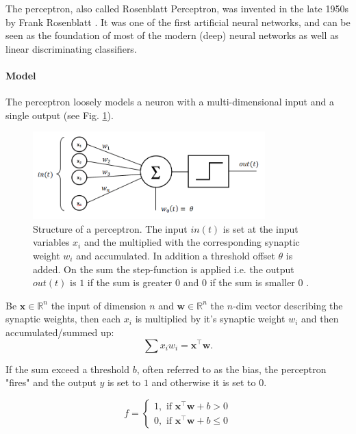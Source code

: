 The perceptron, also called Rosenblatt Perceptron, was invented in the late 1950s by Frank Rosenblatt \cite{rosenblatt1958perceptron}. 
It was one of the first artificial neural networks, and can be seen as the foundation of most of the modern (deep) neural networks as well as linear discriminating classifiers. 

\paragraph{Model}

The perceptron loosely models a neuron with a multi-dimensional input and a single output (see Fig. \ref{fig:perceptron}). 

\begin{figure}
	\centering
    	\includegraphics[width=0.8\textwidth]{imgs/percept.png} 
    \caption{Structure of a perceptron. The input $in(t)$ is set at the input variables $x_i$ and the multiplied with the corresponding synaptic weight $w_i$ and accumulated. In addition a threshold offset $\theta$ is added. On the sum the step-function is applied i.e. the output $out(t)$ is $1$ if the sum is greater $0$ and $0$ if the sum is smaller $0$ \cite{perceptronImg}.}
	\label{fig:perceptron}
\end{figure}

Be $\textbf{x} \in \mathbb{R}^n$ the input of dimension $n$ and $\textbf{w}\in \mathbb{R}^n$ the $n$-dim vector describing the synaptic weights, then each $x_i$ is multiplied by it's synaptic weight $w_i$ and then accumulated/summed up:
\[
\sum x_i w_i = \textbf{x}^\intercal \textbf{w}.
\] 

If the sum exceed a threshold $b$, often referred to as the bias, the perceptron "fires" and the output $y$ is set to $1$ and otherwise it is set to $0$.

\[
	f = 
		\begin{cases}
			1, \text{  if  } \textbf{x}^\intercal \textbf{w} + b > 0  \\
			0, \text{  if  } \textbf{x}^\intercal \textbf{w} + b \le 0
		\end{cases}	
\]

